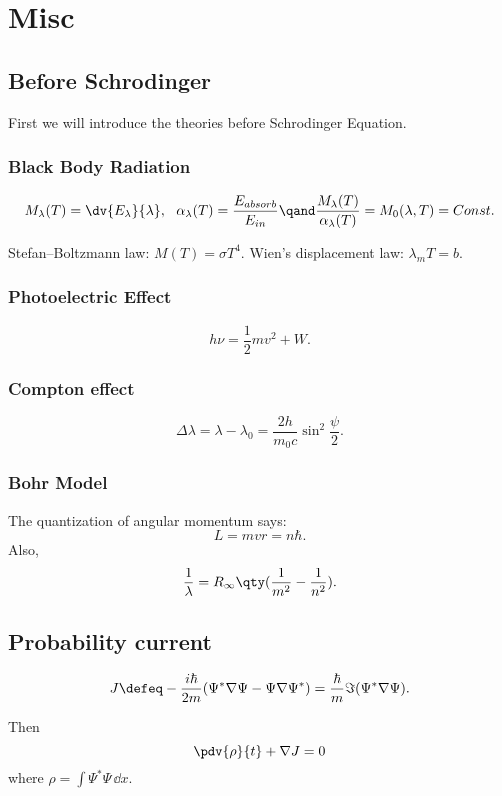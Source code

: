 \section{Misc}
\subsection{Before Schrodinger}
First we will introduce the theories before Schrodinger Equation.
\subsubsection{Black Body Radiation}
\[
	M_\lambda(T)=\dv{E_\lambda}{\lambda},\ \ 
	\alpha_\lambda(T)=\frac{E_{\-{absorb}}}{E_{\-{in}}} \qand
	\frac{M_\lambda(T)}{\alpha_\lambda(T)}=M_0(\lambda,T)=\-{Const}
.\] 
\begin{law}
	Stefan–Boltzmann law: $M(T)=\sigma T^4$. Wien's displacement law: $\lambda_mT=b$.	
\end{law}

\subsubsection{Photoelectric Effect}
\[
    h\nu=\frac{1}{2}mv^2+W
.\] 
\subsubsection{Compton effect}
\[
    \Delta\lambda=\lambda-\lambda_0=\frac{2h}{m_0c}\sin^2\frac{\psi}{2}
.\] 

\subsubsection{Bohr Model}
The quantization of angular momentum says:
\[
    L=mvr=n\hbar
.\] 
Also,
\[
	\frac{1}{\lambda}=R_{\infty}\qty(\frac{1}{m^2}-\frac{1}{n^2})
.\]
\subsection{Probability current}

\begin{defi}
	\[
	    J
		\defeq
		-\frac{i\hbar}{2m}(\Psi^*\nabla\Psi-\Psi\nabla\Psi^*)
		=
		\frac{\hbar}{m}\Im(\Psi^*\nabla\Psi)
	.\] 
\end{defi}

Then 
\[
	\pdv{\rho}{t}+\nabla J = 0
\] 
where $\displaystyle \rho=\int\Psi^*\Psi\,\dd{x}$.

